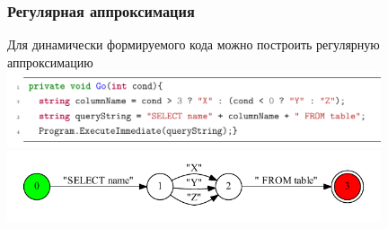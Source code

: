 \documentclass{beamer}
\begin{document}
\begin{frame}
  \transwipe[direction=90]
  \frametitle{Регулярная аппроксимация}
  Для динамически формируемого кода можно построить регулярную 
  аппроксимацию \\[2\baselineskip]
  \includegraphics[width=11cm]{pictures/approx_code.pdf} \\
  \includegraphics[width=11cm]{pictures/approx_fsa.pdf}
\end{frame}
\end{document}
